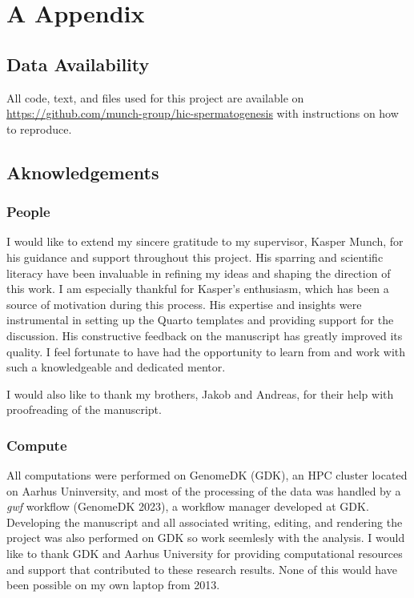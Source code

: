 \documentclass[
  11pt,
  a4paper,
]{scrbook}
\begin{document}
\chapter*{A Appendix}\label{a-appendix}

\section*{Data Availability}\label{data-availability}

All code, text, and files used for this project are available on
\url{https://github.com/munch-group/hic-spermatogenesis} with
instructions on how to reproduce.

\section*{Aknowledgements}\label{aknowledgements}

\subsection*{People}\label{people}

I would like to extend my sincere gratitude to my supervisor, Kasper
Munch, for his guidance and support throughout this project. His
sparring and scientific literacy have been invaluable in refining my
ideas and shaping the direction of this work. I am especially thankful
for Kasper's enthusiasm, which has been a source of motivation during
this process. His expertise and insights were instrumental in setting up
the Quarto templates and providing support for the discussion. His
constructive feedback on the manuscript has greatly improved its
quality. I feel fortunate to have had the opportunity to learn from and
work with such a knowledgeable and dedicated mentor.

I would also like to thank my brothers, Jakob and Andreas, for their
help with proofreading of the manuscript.

\subsection*{Compute}\label{compute}

All computations were performed on GenomeDK (GDK), an HPC cluster
located on Aarhus Uninversity, and most of the processing of the data
was handled by a \emph{gwf} workflow (GenomeDK 2023), a workflow manager
developed at GDK. Developing the manuscript and all associated writing,
editing, and rendering the project was also performed on GDK so work
seemlesly with the analysis. I would like to thank GDK and Aarhus
University for providing computational resources and support that
contributed to these research results. None of this would have been
possible on my own laptop from 2013.
\end{document}
